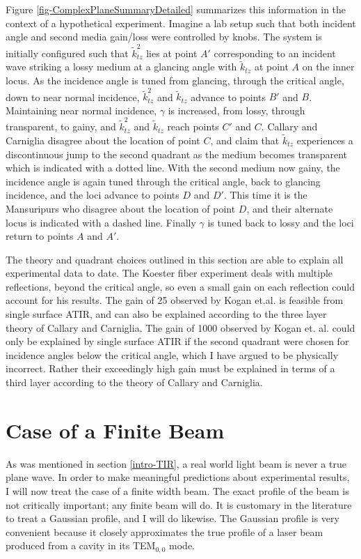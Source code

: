 \documentclass[12pt]{uthesis-v12}
\begin{document}
Figure \ref{fig-ComplexPlaneSummaryDetailed} summarizes this information in the context of a hypothetical experiment. Imagine a lab setup such that both incident angle and second media gain/loss were controlled by knobs. The system is initially configured such that $\tilde{k}_{tz}^2$ lies at point $A'$ corresponding to an incident wave striking a lossy medium at a glancing angle with $\tilde{k}_{tz}$ at point $A$ on the inner locus.  As the incidence angle is tuned from glancing, through the critical angle, down to near normal incidence, $\tilde{k}^2_{tz}$ and $\tilde{k}_{tz}$ advance to points $B'$ and $B$. Maintaining near normal incidence, $\gamma$ is increased, from lossy, through transparent, to gainy, and $\tilde{k}^2_{tz}$ and $\tilde{k}_{tz}$ reach points $C'$ and $C$. Callary and Carniglia disagree about the location of point $C$, and claim that $\tilde{k}_{tz}$ experiences a discontinuous jump to the second quadrant as the medium becomes transparent which is indicated with a dotted line. With the second medium now gainy, the incidence angle is again tuned through the critical angle, back to glancing incidence, and the loci advance to points $D$ and $D'$. This time it is the Mansuripurs who disagree about the location of point $D$, and their alternate locus is indicated with a dashed line. Finally $\gamma$ is tuned back to lossy and the loci return to points $A$ and $A'$.

The theory and quadrant choices outlined in this section are able to explain all experimental data to date. The Koester fiber experiment deals with multiple reflections, beyond the critical angle, so even a small gain on each reflection could account for his results. The gain of 25 observed by Kogan et.al. is feasible from single surface ATIR, and can also be explained according to the three layer theory of Callary and Carniglia. The gain of 1000 observed by Kogan et. al. could only be explained by single surface ATIR if the second quadrant were chosen for incidence angles below the critical angle, which I have argued to be physically incorrect. Rather their exceedingly high gain must be explained in terms of a third layer according to the theory of Callary and Carniglia.


\chapter{Case of a Finite Beam}\label{chap-finiteBeam}
As was mentioned in section \ref{intro-TIR}, a real world light beam is never a true plane wave. In order to make meaningful predictions about experimental results, I will now treat the case of a finite width beam. The exact profile of the beam is not critically important; any finite beam will do. It is customary in the literature \cite{Konopsky}\cite{Willis} to treat a Gaussian profile, and I will do likewise. The Gaussian profile is very convenient because it closely approximates the true profile of a laser beam produced from a cavity in its TEM${}_{0,0}$ mode.
\end{document}

